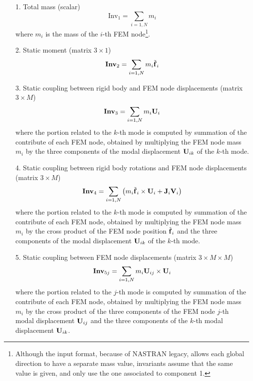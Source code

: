 \begin{enumerate}
\item[1.] Total mass
(scalar)
\begin{equation}
	\mathrm{Inv}_1 = \sum_{i=1,N} m_i
\end{equation}
where $m_i$ is the mass of the $i$-th FEM node\footnote{Although the input
format, because of NASTRAN legacy, allows each global direction to have
a separate mass value, invariants assume that the same value is given,
and only use the one associated to component 1.}.

\item[2.] Static moment
(matrix $3\times{1}$)
\begin{equation}
	\bm{\mathbf{Inv}}_2 = \sum_{i=1,N} m_i \tilde{\bm{\mathbf{f}}}_i
\end{equation}

\item[3.] Static coupling between rigid body and FEM node displacements
(matrix $3\times{M}$)
\begin{equation}
	\bm{\mathbf{Inv}}_3 = \sum_{i=1,N} m_i \bm{\mathbf{U}}_i
\end{equation}
where the portion related to the $k$-th mode is computed by summation
of the contribute of each FEM node, obtained by multiplying the FEM node
mass $m_i$ by the three components of the modal displacement $\bm{\mathbf{U}}_{ik}$
of the $k$-th mode.

\item[4.] Static coupling between rigid body rotations and FEM node 
displacements
(matrix $3\times{M}$)
\begin{equation}
	\bm{\mathbf{Inv}}_4 = \sum_{i=1,N} \left( 
		m_i \tilde{\bm{\mathbf{f}}}_i \times \bm{\mathbf{U}}_i
		+ \bm{\mathbf{J}}_i \bm{\mathbf{V}}_i
	 \right)
\end{equation}
where the portion related to the $k$-th mode is computed by summation
of the contribute of each FEM node, obtained by multiplying the FEM node
mass $m_i$ by the cross product of the FEM node position $\tilde{\bm{\mathbf{f}}}_i$ 
and the three components of the modal displacement $\bm{\mathbf{U}}_{ik}$ of the
$k$-th mode.

\item[5.] Static coupling between FEM node displacements
(matrix $3\times{M}\times{M}$)
\begin{equation}
	\bm{\mathbf{Inv}}_{5j} = \sum_{i=1,N} m_i \bm{\mathbf{U}}_{ij} \times \bm{\mathbf{U}}_i
\end{equation}
where the portion related to the $j$-th mode is computed by summation
of the contribute of each FEM node, obtained by multiplying the FEM node
mass $m_i$ by the cross product of the three components of the FEM node 
$j$-th modal displacement $\bm{\mathbf{U}}_{ij}$ and the three components of the 
$k$-th modal displacement $\bm{\mathbf{U}}_{ik}$.


\end{enumerate}

